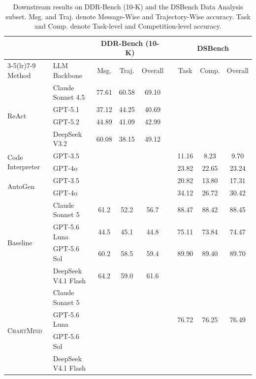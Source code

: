 \documentclass{article}
\newcommand{\method}{\textsc{ChartMind}\xspace}
\begin{document}
\begin{table}[t]
\caption{Downstream results on DDR-Bench (10-K) and the DSBench Data Analysis subset. Msg. and Traj. denote Message-Wise and Trajectory-Wise accuracy. Task and Comp. denote Task-level and Competition-level accuracy.}
\label{tab:downstream-matrix}
\centering
\small
\setlength{\tabcolsep}{6pt}
\begin{tabular}{@{}llccccccc@{}}
\toprule
 & & \multicolumn{3}{c}{DDR-Bench (10-K)} & & \multicolumn{3}{c}{DSBench} \\
\cmidrule(lr){3-5}\cmidrule(lr){7-9}
Method & LLM Backbone & Msg. & Traj. & Overall & & Task & Comp. & Overall \\
\midrule
\multirow{4}{*}{ReAct}
& Claude Sonnet 4.5 & 77.61 & 60.58 & 69.10 & &  &  &  \\
& GPT-5.1 & 37.12 & 44.25 & 40.69 & &  &  &  \\
& GPT-5.2 & 44.89 & 41.09 & 42.99 & &  &  &  \\
& DeepSeek V3.2 & 60.08 & 38.15 & 49.12 & &  &  &  \\
\midrule
\multirow{2}{*}{Code Interpreter} & GPT-3.5 &  &  &  & & 11.16 & 8.23 & 9.70 \\
& GPT-4o &  &  &  & & 23.82 & 22.65 & 23.24 \\
\midrule
\multirow{2}{*}{AutoGen} & GPT-3.5 &  &  &  & & 20.82 & 13.80 & 17.31 \\
& GPT-4o &  &  &  & & 34.12 & 26.72 & 30.42 \\
\midrule
\multirow{4}{*}{Baseline}
& Claude Sonnet 5 & 61.2 & 52.2 & 56.7 & & 88.47 & 88.42 & 88.45 \\
& GPT-5.6 Luna & 44.5 & 45.1 & 44.8 & & 75.11 & 73.84 & 74.47 \\
& GPT-5.6 Sol & 60.2 & 58.5 & 59.4 & & 89.90 & 89.40 & 89.70 \\
& DeepSeek V4.1 Flash & 64.2 & 59.0 & 61.6 & &  &  &  \\
\midrule
\multirow{4}{*}{\method{}}
& Claude Sonnet 5 &  &  &  & &  &  &  \\
& GPT-5.6 Luna &  &  &  & & 76.72 & 76.25 & 76.49 \\
& GPT-5.6 Sol &  &  &  & &  &  &  \\
& DeepSeek V4.1 Flash &  &  &  & &  &  &  \\
\bottomrule
\end{tabular}
\end{table}
\end{document}
